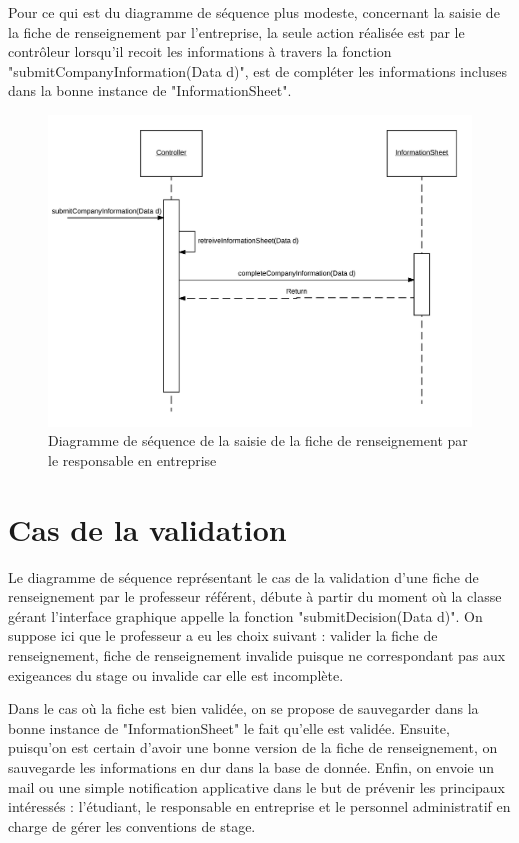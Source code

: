 \documentclass{scrreprt}
\begin{document}
	Pour ce qui est du diagramme de séquence plus modeste, concernant la saisie de la fiche de renseignement par l'entreprise, 
la seule action réalisée est par le contrôleur lorsqu'il recoit les informations à travers la fonction "submitCompanyInformation(Data d)",
est de compléter les informations incluses dans la bonne instance de "InformationSheet".

\begin{figure}[h]
\centering
\includegraphics[width=15cm]{images/submitCompanySeqDiagram.png}
\caption{Diagramme de séquence de la saisie de la fiche de renseignement par le responsable en entreprise}
\end{figure}

\newpage
\section{Cas de la validation}

	Le diagramme de séquence représentant le cas de la validation d'une fiche de renseignement par le professeur référent, débute 
à partir du moment où la classe gérant l'interface graphique appelle la fonction "submitDecision(Data d)". On suppose ici que 
le professeur a eu les choix suivant : valider la fiche de renseignement, fiche de renseignement invalide puisque ne correspondant 
pas aux exigeances du stage ou invalide car elle est incomplète. 

	Dans le cas où la fiche est bien validée, on se propose de sauvegarder dans la bonne instance de "InformationSheet" le fait qu'elle est 
validée. Ensuite, puisqu'on est certain d'avoir une bonne version de la fiche de renseignement, on sauvegarde les informations en dur 
dans la base de donnée. Enfin, on envoie un mail ou une simple notification applicative dans le but de prévenir les principaux intéressés :
l'étudiant, le responsable en entreprise et le personnel administratif en charge de gérer les conventions de stage.
\end{document}
